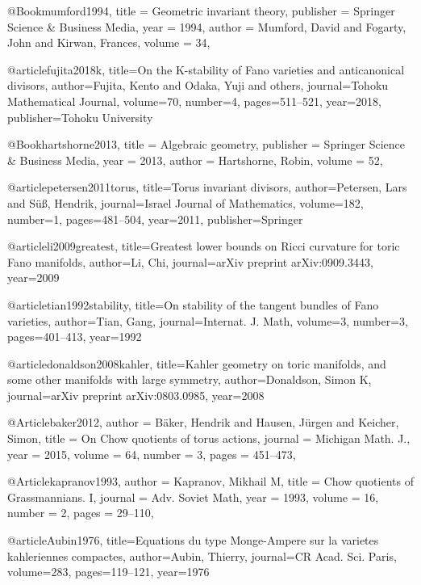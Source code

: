 


@Book{mumford1994,
  title     = {Geometric invariant theory},
  publisher = {Springer Science \& Business Media},
  year      = {1994},
  author    = {Mumford, David and Fogarty, John and Kirwan, Frances},
  volume    = {34},
}

@article{fujita2018k,
  title={On the K-stability of Fano varieties and anticanonical divisors},
  author={Fujita, Kento and Odaka, Yuji and others},
  journal={Tohoku Mathematical Journal},
  volume={70},
  number={4},
  pages={511--521},
  year={2018},
  publisher={Tohoku University}
}


@Book{hartshorne2013,
  title     = {Algebraic geometry},
  publisher = {Springer Science \& Business Media},
  year      = {2013},
  author    = {Hartshorne, Robin},
  volume    = {52},
}

@article{petersen2011torus,
  title={Torus invariant divisors},
  author={Petersen, Lars and S{\"u}{\ss}, Hendrik},
  journal={Israel Journal of Mathematics},
  volume={182},
  number={1},
  pages={481--504},
  year={2011},
  publisher={Springer}
}

@article{li2009greatest,
  title={Greatest lower bounds on Ricci curvature for toric Fano manifolds},
  author={Li, Chi},
  journal={arXiv preprint arXiv:0909.3443},
  year={2009}
}


@article{tian1992stability,
  title={On stability of the tangent bundles of {F}ano varieties},
  author={Tian, Gang},
  journal={Internat. J. Math},
  volume={3},
  number={3},
  pages={401--413},
  year={1992}
}

@article{donaldson2008kahler,
  title={Kahler geometry on toric manifolds, and some other manifolds with large symmetry},
  author={Donaldson, Simon K},
  journal={arXiv preprint arXiv:0803.0985},
  year={2008}
}


@Article{baker2012,
  author  = {B{\"a}ker, Hendrik and Hausen, J{\"u}rgen and Keicher, Simon},
  title   = {On {C}how quotients of torus actions},
  journal = {Michigan Math. J.},
  year    = {2015},
  volume  = {64},
  number  = {3},
  pages   = {451--473},
}

@Article{kapranov1993,
  author  = {Kapranov, Mikhail M},
  title   = {Chow quotients of {G}rassmannians. {I}},
  journal = {Adv. Soviet Math},
  year    = {1993},
  volume  = {16},
  number  = {2},
  pages   = {29--110},
}

@article{Aubin1976,
  title={Equations du type Monge-Ampere sur la varietes kahleriennes compactes},
  author={Aubin, Thierry},
  journal={CR Acad. Sci. Paris},
  volume={283},
  pages={119--121},
  year={1976}
}

